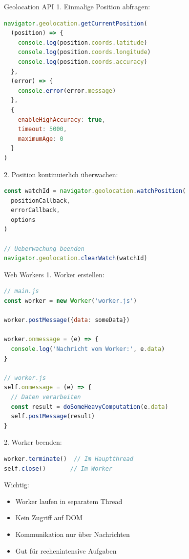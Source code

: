 \begin{KR}{Geolocation API}
1. Einmalige Position abfragen:
\begin{lstlisting}[language=JavaScript, style=basesmol]
navigator.geolocation.getCurrentPosition(
  (position) => {
    console.log(position.coords.latitude)
    console.log(position.coords.longitude)
    console.log(position.coords.accuracy)
  },
  (error) => {
    console.error(error.message)
  },
  {
    enableHighAccuracy: true,
    timeout: 5000,
    maximumAge: 0
  }
)
\end{lstlisting}

2. Position kontinuierlich überwachen:
\begin{lstlisting}[language=JavaScript, style=basesmol]
const watchId = navigator.geolocation.watchPosition(
  positionCallback,
  errorCallback,
  options
)

// Ueberwachung beenden
navigator.geolocation.clearWatch(watchId)
\end{lstlisting}
\end{KR}



\begin{KR}{Web Workers}
1. Worker erstellen:
\begin{lstlisting}[language=JavaScript, style=basesmol]
// main.js
const worker = new Worker('worker.js')

worker.postMessage({data: someData})

worker.onmessage = (e) => {
  console.log('Nachricht vom Worker:', e.data)
}

// worker.js
self.onmessage = (e) => {
  // Daten verarbeiten
  const result = doSomeHeavyComputation(e.data)
  self.postMessage(result)
}
\end{lstlisting}

2. Worker beenden:
\begin{lstlisting}[language=JavaScript, style=basesmol]
worker.terminate()  // Im Hauptthread
self.close()       // Im Worker
\end{lstlisting}

Wichtig:
\begin{itemize}
  \item Worker laufen in separatem Thread
  \item Kein Zugriff auf DOM
  \item Kommunikation nur über Nachrichten
  \item Gut für rechenintensive Aufgaben
\end{itemize}
\end{KR}

